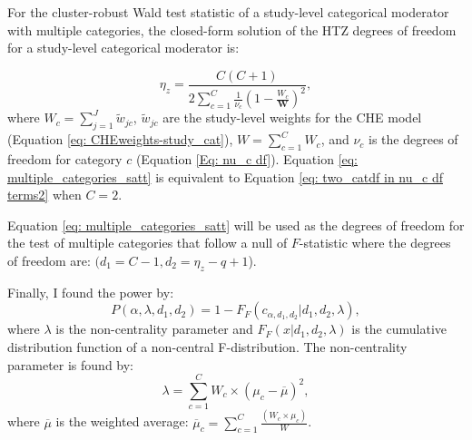 For the cluster-robust Wald test statistic of a study-level categorical moderator with multiple categories, the closed-form solution of the HTZ degrees of freedom for a study-level categorical moderator is:

\begin{equation}
    \label{eq: multiple_categories_satt}
    \eta_z = \frac{C(C+1)}{2\sum_{c=1}^C \frac{1}{\nu_c}\left(1 - \frac{W_c}{\mathbf{W} } \right)^2},
\end{equation}
where $W_c = \sum_{j=1}^J \tilde{w}_{jc}$, $\tilde{w}_{jc}$ are the study-level weights for the CHE model (Equation \ref{eq: CHEweights-study_cat}), $W = \sum_{c=1}^C W_c$, and $\nu_c$ is the degrees of freedom for category $c$ (Equation \ref{Eq: nu_c df}). Equation \ref{eq: multiple_categories_satt} is equivalent to Equation \ref{eq: two_catdf in nu_c df terms2} when $C=2$.


Equation \ref{eq: multiple_categories_satt} will be used as the degrees of freedom for the test of multiple categories that follow a null of $F$-statistic where the degrees of freedom are:  $(d_1 = C-1, d_2 = \eta_z - q +1$).

Finally, I found the power by:
\begin{equation} \label{eq: power F}
    P(\alpha, \lambda, d_1, d_2) = 1 - F_F(c_{\alpha, d_1, d_2 }| d_1, d_2, \lambda),
\end{equation}
where $\lambda$ is the non-centrality parameter and $F_F(x| d_1, d_2, \lambda)$ is the cumulative distribution function of a non-central F-distribution. The non-centrality parameter is found by: 
\begin{equation} \label{eq: NCP}
    \lambda = \sum_{c=1}^C W_c \times (\mu_c - \overline{\mu})^2,
\end{equation}
where $\overline{\mu}$ is the weighted average: $\overline{\mu}_c = \sum_{c=1}^C \frac{(W_c \times \mu_c)}{W}$.







